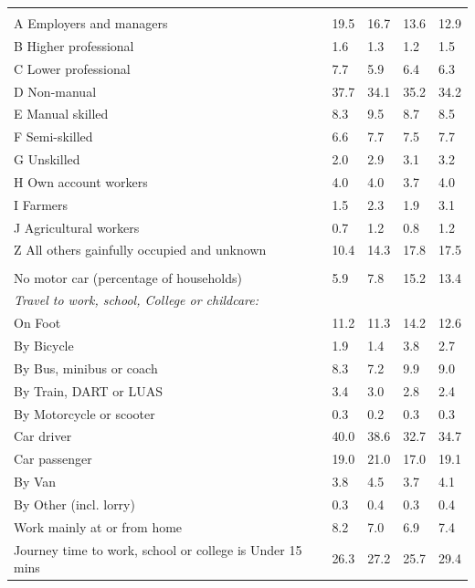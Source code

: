\documentclass{article}
\begin{document}
\begin{table}[h]
\begin{tabular}{KTTTT}
\hline
    \\ 
    \hline
A Employers and managers & 19.5& 16.7& 13.6& 12.9\\
B Higher professional & 1.6& 1.3& 1.2& 1.5\\
C Lower professional & 7.7& 5.9& 6.4& 6.3\\
D Non-manual & 37.7& 34.1& 35.2& 34.2\\
E Manual skilled & 8.3& 9.5& 8.7& 8.5\\
F Semi-skilled & 6.6& 7.7& 7.5& 7.7\\
G Unskilled & 2.0& 2.9& 3.1& 3.2\\
H Own account workers & 4.0& 4.0& 3.7& 4.0\\
I Farmers & 1.5& 2.3& 1.9& 3.1\\
J Agricultural workers & 0.7& 1.2& 0.8& 1.2\\
Z All others gainfully occupied and unknown & 10.4& 14.3& 17.8& 17.5\\
\hline
{}\hline
    \\ 
    \hline
No motor car (percentage of households) &  5.9&  7.8& 15.2& 
13.4\\
    \hline 
\emph{Travel to work, school, College or childcare:} & & & \\
\quad On Foot & 11.2& 11.3& 14.2& 12.6\\ 
\quad By Bicycle & 1.9& 1.4& 3.8& 2.7\\ 
\quad By Bus, minibus or coach & 8.3& 7.2& 9.9& 9.0\\
\quad By Train, DART or LUAS & 3.4& 3.0& 2.8& 2.4\\
\quad By Motorcycle or scooter & 0.3& 0.2& 0.3& 0.3\\
\quad Car driver & 40.0 & 38.6& 32.7& 34.7\\
\quad Car passenger & 19.0& 21.0& 17.0& 19.1\\
\quad By Van & 3.8& 4.5& 3.7& 4.1\\
\quad By Other (incl. lorry) & 0.3& 0.4& 0.3& 0.4\\
    \hline
Work mainly at or from home & 8.2& 7.0& 6.9& 7.4\\
Journey time to work, school or college is Under 15 mins & 26.3& 27.2& 25.7& 29.4\\

\end{tabular}
\end{table}
\end{document}
